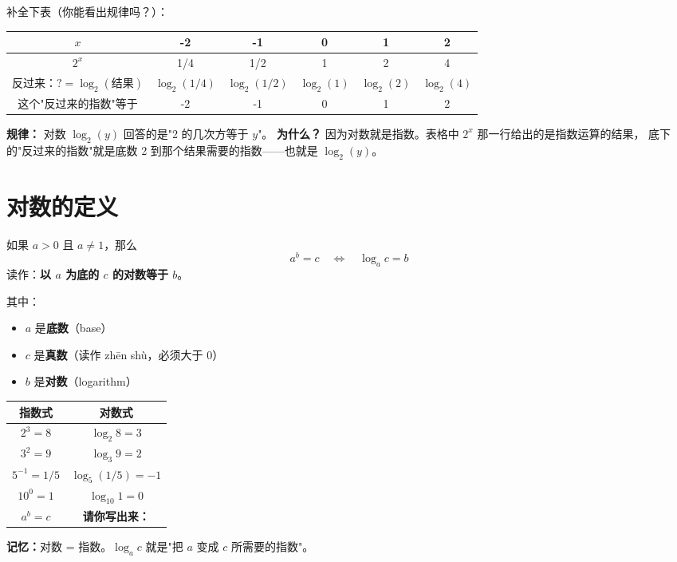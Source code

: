 \begin{examplebox}
补全下表（你能看出规律吗？）：

\begin{center}
\begin{tabular}{c|c|c|c|c|c}
\(x\) & -2 & -1 & 0 & 1 & 2 \\
\hline
\(2^x\) & 1/4 & 1/2 & 1 & 2 & 4 \\
反过来：\(? = \log_2(\text{结果})\) & \(\log_2(1/4)\) & \(\log_2(1/2)\) & \(\log_2(1)\) & \(\log_2(2)\) & \(\log_2(4)\) \\
\hline
这个"反过来的指数"等于 & -2 & -1 & 0 & 1 & 2 \\
\end{tabular}
\end{center}

\textbf{规律：} 对数 \(\log_2(y)\) 回答的是"2 的几次方等于 \(y\)"。
\textbf{为什么？} 因为对数就是指数。表格中 \(2^x\) 那一行给出的是指数运算的结果，
底下的"反过来的指数"就是底数 2 到那个结果需要的指数——也就是 \(\log_2(y)\)。
\end{examplebox}


\section{对数的定义}

\begin{definitionbox}[对数]
如果 \(a > 0\) 且 \(a \neq 1\)，那么
\[
a^b = c \quad\Longleftrightarrow\quad \log_a c = b
\]
读作：\textbf{以 \(a\) 为底的 \(c\) 的对数等于 \(b\)}。

其中：
\begin{itemize}
  \item \(a\) 是\textbf{底数}（base）
  \item \(c\) 是\textbf{真数}（读作 zhēn shù，必须大于 0）
  \item \(b\) 是\textbf{对数}（logarithm）
\end{itemize}
\end{definitionbox}

\begin{examplebox}
\begin{center}
\begin{tabular}{c|c}
\textbf{指数式} & \textbf{对数式} \\
\hline
\(2^3 = 8\) & \(\log_2 8 = 3\) \\
\(3^2 = 9\) & \(\log_3 9 = 2\) \\
\(5^{-1} = 1/5\) & \(\log_5 (1/5) = -1\) \\
\(10^0 = 1\) & \(\log_{10} 1 = 0\) \\
\hline
\(a^b = c\) & \multicolumn{1}{c}{\textbf{请你写出来：}}
\end{tabular}
\end{center}

\textbf{记忆：}对数 = 指数。\(\log_a c\) 就是"把 \(a\) 变成 \(c\) 所需要的指数"。
\end{examplebox}



